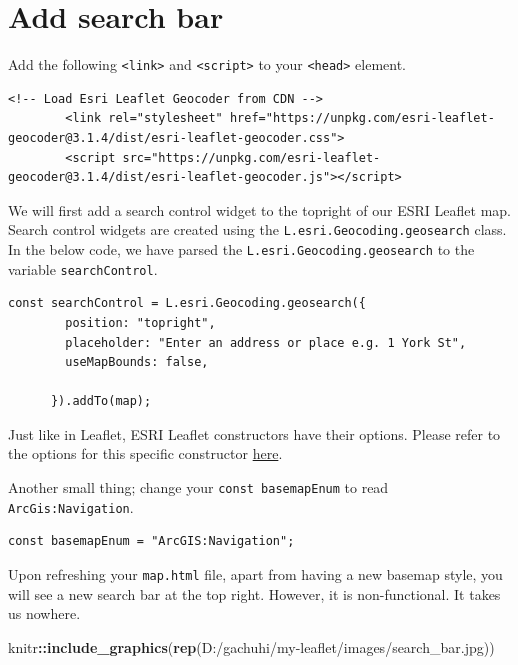 \documentclass[
]{book}
\newenvironment{Shaded}{\begin{snugshade}}{\end{snugshade}}
\newcommand{\FunctionTok}[1]{\textcolor[rgb]{0.13,0.29,0.53}{\textbf{#1}}}
\newcommand{\NormalTok}[1]{#1}
\newcommand{\SpecialCharTok}[1]{\textcolor[rgb]{0.81,0.36,0.00}{\textbf{#1}}}
\newcommand{\StringTok}[1]{\textcolor[rgb]{0.31,0.60,0.02}{#1}}
\begin{document}
\hypertarget{add-search-bar}{%
\section{Add search bar}\label{add-search-bar}}

Add the following \texttt{\textless{}link\textgreater{}} and \texttt{\textless{}script\textgreater{}} to your \texttt{\textless{}head\textgreater{}} element.

\begin{verbatim}
<!-- Load Esri Leaflet Geocoder from CDN -->
        <link rel="stylesheet" href="https://unpkg.com/esri-leaflet-geocoder@3.1.4/dist/esri-leaflet-geocoder.css">
        <script src="https://unpkg.com/esri-leaflet-geocoder@3.1.4/dist/esri-leaflet-geocoder.js"></script>
\end{verbatim}

We will first add a search control widget to the topright of our ESRI Leaflet map. Search control widgets are created using the \texttt{L.esri.Geocoding.geosearch} class. In the below code, we have parsed the \texttt{L.esri.Geocoding.geosearch} to the variable \texttt{searchControl}.

\begin{verbatim}
const searchControl = L.esri.Geocoding.geosearch({
        position: "topright",
        placeholder: "Enter an address or place e.g. 1 York St",
        useMapBounds: false,

      }).addTo(map);
\end{verbatim}

Just like in Leaflet, ESRI Leaflet constructors have their options. Please refer to the options for this specific constructor \href{https://developers.arcgis.com/esri-leaflet/api-reference/controls/geosearch/}{here}.

Another small thing; change your \texttt{const\ basemapEnum} to read \texttt{ArcGis:Navigation}.

\begin{verbatim}
const basemapEnum = "ArcGIS:Navigation";
\end{verbatim}

Upon refreshing your \texttt{map.html} file, apart from having a new basemap style, you will see a new search bar at the top right. However, it is non-functional. It takes us nowhere.

\begin{Shaded}
\begin{Highlighting}[]
\NormalTok{knitr}\SpecialCharTok{::}\FunctionTok{include\_graphics}\NormalTok{(}\FunctionTok{rep}\NormalTok{(}\StringTok{\textquotesingle{}D:/gachuhi/my{-}leaflet/images/search\_bar.jpg\textquotesingle{}}\NormalTok{))}
\end{Highlighting}
\end{Shaded}
\end{document}
